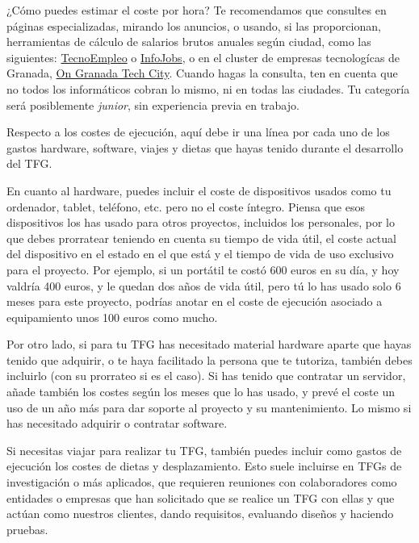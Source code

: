 ¿Cómo puedes estimar el coste por hora? Te recomendamos que consultes en páginas especializadas, mirando los anuncios, o usando, si las proporcionan, herramientas de cálculo de salarios brutos anuales según ciudad, como las siguientes: \href{https://www.tecnoempleo.com/ofertas-trabajo/}{TecnoEmpleo} o \href{https://www.tecnoempleo.com/ofertas-trabajo/}{InfoJobs}, o en el cluster de empresas tecnologícas de Granada, \href{https://www.ontechinnovation.com/bolsa-de-trabajo/}{On Granada Tech City}. Cuando hagas la consulta, ten en cuenta que no todos los informáticos cobran lo mismo, ni en todas las ciudades. Tu categoría será posiblemente \textit{junior}, sin experiencia previa en trabajo. 

Respecto a los costes de ejecución, aquí debe ir una línea por cada uno de los gastos hardware, software, viajes y dietas que hayas tenido durante el desarrollo del TFG. 

En cuanto al hardware, puedes incluir el coste de dispositivos usados como tu ordenador, tablet, teléfono, etc. pero no el coste íntegro. Piensa que esos dispositivos los has usado para otros proyectos, incluidos los personales, por lo que debes prorratear teniendo en cuenta su tiempo de vida útil, el coste actual del dispositivo en el estado en el que está y el tiempo de vida de uso exclusivo para el proyecto. Por ejemplo, si un portátil te costó 600 euros en su día, y hoy valdría 400 euros, y le quedan dos años de vida útil, pero tú lo has usado solo 6 meses para este proyecto, podrías anotar en el coste de ejecución asociado a equipamiento unos 100 euros como mucho.  

Por otro lado, si para tu TFG has necesitado material hardware aparte que hayas tenido que adquirir, o te haya facilitado la persona que te tutoriza, también debes incluirlo (con su prorrateo si es el caso). Si has tenido que contratar un servidor, añade también los costes según los meses que lo has usado, y prevé el coste un uso de un año más para dar soporte al proyecto y su mantenimiento. Lo mismo si has necesitado adquirir o contratar software.

Si necesitas viajar para realizar tu TFG, también puedes incluir como gastos de ejecución los costes de dietas y desplazamiento. Esto suele incluirse en TFGs de investigación o más aplicados, que requieren reuniones con colaboradores como entidades o empresas que han solicitado que se realice un TFG con ellas y que actúan como nuestros clientes, dando requisitos, evaluando diseños y haciendo pruebas. 

